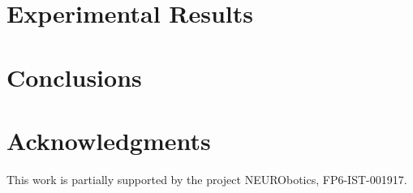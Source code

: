 \documentclass[conference,letterpaper]{IEEEtran}
\begin{document}
\section{Experimental Results}
\label{sec:exp}


\section{Conclusions}
\label{sec:concl}



\section*{Acknowledgments}

This work is partially supported by the project NEURObotics,
FP6-IST-001917.

{\small


}
\end{document}
